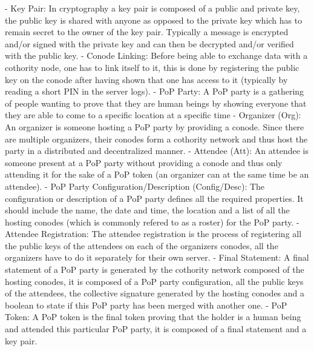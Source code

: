 - Key Pair:
In cryptography a key pair is composed of a public and private key, the public key is shared with anyone as opposed to the private key which has to remain secret to the owner of the key pair. Typically a message is encrypted and/or signed with the private key and can then be decrypted and/or verified with the public key.
- Conode Linking:
Before being able to exchange data with a cothority node, one has to link itself to it, this is done by registering the public key on the conode after having shown that one has access to it (typically by reading a short PIN in the server logs).
- PoP Party:
A PoP party is a gathering of people wanting to prove that they are human beings by showing everyone that they are able to come to a specific location at a specific time
- Organizer (Org):
An organizer is someone hosting a PoP party by providing a conode. Since there are multiple organizers, their conodes form a cothority network and thus host the party in a distributed and decentralized manner.
- Attendee (Att):
An attendee is someone present at a PoP party without providing a conode and thus only attending it for the sake of a PoP token (an organizer can at the same time be an attendee).
- PoP Party Configuration/Description (Config/Desc):
The configuration or description of a PoP party defines all the required properties. It should include the name, the date and time, the location and a list of all the hosting conodes (which is commonly refered to as a roster) for the PoP party.
- Attendee Registration:
The attendee registration is the process of registering all the public keys of the attendees on each of the organizers conodes, all the organizers have to do it separately for their own server.
- Final Statement:
A final statement of a PoP party is generated by the cothority network composed of the hosting conodes, it is composed of a PoP party configuration, all the public keys of the attendees, the collective signature generated by the hosting conodes and a boolean to state if this PoP party has been merged with another one.
- PoP Token:
A PoP token is the final token proving that the holder is a human being and attended this particular PoP party, it is composed of a final statement and a key pair.

